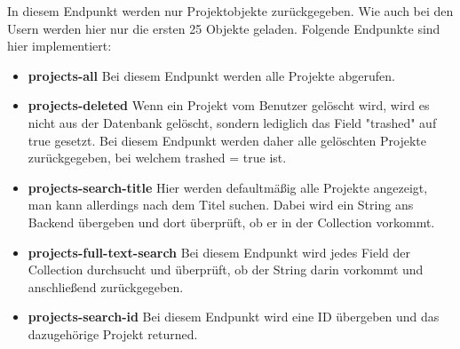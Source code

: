In diesem Endpunkt werden nur Projektobjekte zurückgegeben. Wie auch bei den Usern werden hier nur die ersten 25 Objekte geladen. Folgende Endpunkte sind hier implementiert:
\begin{itemize}
    \item \textbf{projects-all}
        \newline
        Bei diesem Endpunkt werden alle Projekte abgerufen.
    \item \textbf{projects-deleted}
        \newline
        Wenn ein Projekt vom Benutzer gelöscht wird, wird es nicht aus der Datenbank gelöscht, sondern lediglich das Field "trashed" auf true gesetzt. Bei diesem Endpunkt werden daher alle gelöschten Projekte zurückgegeben, bei welchem trashed = true ist.
    \item \textbf{projects-search-title}
        \newline
        Hier werden defaultmäßig alle Projekte angezeigt, man kann allerdings nach dem Titel suchen. Dabei wird ein String ans Backend übergeben und dort überprüft, ob er in der Collection vorkommt.
    \item \textbf{projects-full-text-search}
        \newline
        Bei diesem Endpunkt wird jedes Field der Collection durchsucht und überprüft, ob der String darin vorkommt und anschließend zurückgegeben.
    \item \textbf{projects-search-id}
        \newline
        Bei diesem Endpunkt wird eine ID übergeben und das dazugehörige Projekt returned.
\end{itemize}